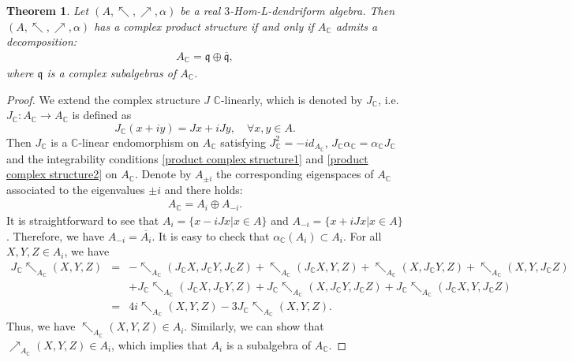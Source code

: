 \documentclass[a4paper,11pt]{article}
\def\a{\alpha}
\def\nw{\nwarrow}
\def\ne{\nearrow}
\newtheorem{thm}{Theorem}[section]
\theoremstyle{definition}
\begin{document}
\begin{thm}\label{product-structure-subalgebra}
Let $(A,\nw,\ne,\alpha)$ be a real $3$-Hom-L-dendriform algebra. Then $(A,\nw,\ne,\alpha)$ has a complex product structure if and only if $A_{\mathbb C}$ admits a decomposition:
\begin{eqnarray}
A_{\mathbb C}=\mathfrak{q}\oplus\overline{\mathfrak{q}},
\end{eqnarray}
where $\mathfrak{q}$ is a complex subalgebras of $A_{\mathbb C}$.\end{thm}
\begin{proof}
We  extend the complex structure $J$ $\mathbb C$-linearly, which is denoted by $J_{\mathbb C}$, i.e. $J_{\mathbb C}: A_{\mathbb C}\longrightarrow  A_{\mathbb C}$ is defined as
\begin{equation}\label{eq:JC}
J_{\mathbb C}(x+iy)=Jx+iJy,\quad \forall x,y\in A.
\end{equation} Then $J_{\mathbb C}$ is a $\mathbb C$-linear endomorphism on $ A_{\mathbb C}$ satisfying $J_{\mathbb C}^2=-id_{A_{\mathbb C}}$, $J_{\mathbb C}\a_{\mathbb C}=\a_{\mathbb C}J_{\mathbb C}$ and the integrability conditions \eqref{product complex structure1} and \eqref{product complex structure2} on $ A_{\mathbb C}$. Denote by $ A_{\pm i}$ the corresponding eigenspaces of $ A_{\mathbb C}$ associated to the eigenvalues $\pm i$ and there holds:
   \begin{eqnarray*}
 A_{\mathbb C}= A_{i}\oplus A_{-i}.
\end{eqnarray*}
  It is straightforward to see that  $ A_{i}=\{x-iJx|x\in A\}$ and $ A_{-i}=\{x+iJx|x\in A\}$. Therefore, we have $ A_{-i}= \overline{A_{i}}$. It is easy to check that $\a_{\mathbb C}(A_i)\subset A_i$.
For all $X,Y,Z\in A_{i}$, we have
\begin{eqnarray*}
J_{\mathbb C}\nw_{ A_{\mathbb C}}(X,Y,Z)&=&-\nw_{ A_{\mathbb C}}(J_{\mathbb C}X,J_{\mathbb C}Y,J_{\mathbb C}Z)+\nw_{ A_{\mathbb C}}(J_{\mathbb C}X,Y,Z)+\nw_{ A_{\mathbb C}}(X,J_{\mathbb C}Y,Z)+\nw_{ A_{\mathbb C}}(X,Y,J_{\mathbb C}Z)\\
&&+J_{\mathbb C}\nw_{ A_{\mathbb C}}(J_{\mathbb C}X,J_{\mathbb C}Y,Z)+J_{\mathbb C}\nw_{ A_{\mathbb C}}(X,J_{\mathbb C}Y,J_{\mathbb C}Z)+J_{\mathbb C}\nw_{ A_{\mathbb C}}(J_{\mathbb C}X,Y,J_{\mathbb C}Z)\\
&=&4i\nw_{ A_{\mathbb C}}(X,Y,Z)-3J_{\mathbb C}\nw_{ A_{\mathbb C}}(X,Y,Z).
\end{eqnarray*}
Thus, we have $\nw_{ A_{\mathbb C}}(X,Y,Z)\in A_{i}$. Similarly, we can show that $\ne_{ A_{\mathbb C}}(X,Y,Z)\in A_{i}$, which implies that $ A_i$ is a subalgebra of $A_{\mathbb C}$.

\end{proof}
\end{document}
